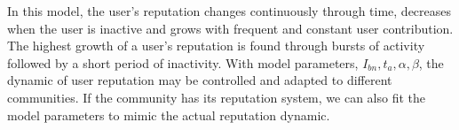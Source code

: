 In this model, the user's reputation changes continuously through time, decreases when the user is inactive and grows with frequent and constant user contribution. The highest growth of a user's reputation is found through bursts of activity followed by a short period of inactivity. With model parameters, $I_{bn}, t_a, \alpha, \beta$, the dynamic of user reputation may be controlled and adapted to different communities. If the community has its reputation system, we can also fit the model parameters to mimic the actual reputation dynamic. 















